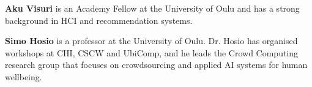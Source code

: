 \documentclass[manuscript,screen,review]{acmart}
\begin{document}
\noindent\textbf{Aku Visuri} is an Academy Fellow at the University of Oulu and has a strong background in HCI and recommendation systems.

\noindent\textbf{Simo Hosio} is a professor at the University of Oulu. Dr. Hosio has organised workshops at CHI, CSCW and UbiComp, and he leads the Crowd Computing research group that focuses on crowdsourcing and applied AI systems for human wellbeing.




\appendix
\end{document}
